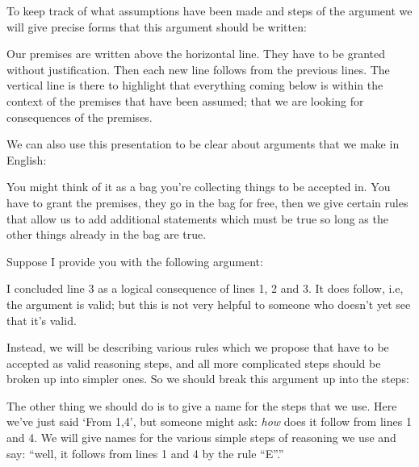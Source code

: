 To keep track of what assumptions have been made and steps of the argument we will give precise forms that this argument should be written:
\begin{pf}
\end{pf}
Our premises are written above the horizontal line. They have to be granted without justification. Then each new line follows from the previous lines. The vertical line is there to highlight that everything coming below is within the context of the premises that have been assumed; that we are looking for consequences of the premises.

We can also use this presentation to be clear about arguments that we make in English:
\begin{pf}
\end{pf}

You might think of it as a bag you're collecting things to be accepted in. You have to grant the premises, they go in the bag for free, then we give certain rules that allow us to add additional statements which must be true so long as the other things already in the bag are true.


Suppose I provide you with the following argument:
\begin{pf}
\end{pf}
I concluded line 3 as a logical consequence of lines 1, 2 and 3. It does follow, i.e, the argument is valid; but this is not very helpful to someone who doesn't yet see that it's valid.

Instead, we will be describing various rules which we propose that have to be accepted as valid reasoning steps, and all more complicated steps should be broken up into simpler ones. So we should break this argument up into the steps:
 \begin{pf}
 \end{pf}

The other thing we should do is to give a name for the steps that we use. Here we've just said `From 1,4', but someone might ask: \emph{how} does it follow from lines 1 and 4. We will give names for the various simple steps of reasoning we use and say: ``well, it follows from lines 1 and 4 by the rule ``\eif E''.''
 \begin{pf}
 \end{pf}

